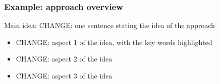 
\begin{frame}
    \frametitle{Example: approach overview}

    Main \alert{idea}: CHANGE: one sentence stating the idea of the approach

    \vspace{1em}

    \begin{itemize}\setlength{\itemsep}{1em}
        \item CHANGE: aspect 1 of the idea, with the \alert{key words} highlighted
        \item CHANGE: aspect 2 of the idea
        \item CHANGE: aspect 3 of the idea
    \end{itemize}

\end{frame}

